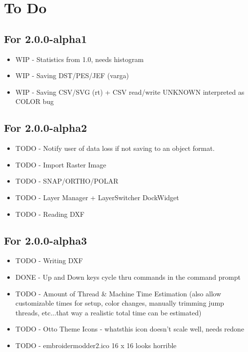 \documentclass{report}
\begin{document}
\section{To Do}

\subsection{For 2.0.0-alpha1}

\begin{itemize}
\item WIP - Statistics from 1.0, needs histogram
\item WIP - Saving DST/PES/JEF (varga)
\item WIP - Saving CSV/SVG (rt) + CSV read/write UNKNOWN interpreted as COLOR bug
\end{itemize}

\subsection{For 2.0.0-alpha2}

\begin{itemize}
\item TODO - Notify user of data loss if not saving to an object format.
\item TODO - Import Raster Image
\item TODO - SNAP/ORTHO/POLAR
\item TODO - Layer Manager + LayerSwitcher DockWidget
\item TODO - Reading DXF
\end{itemize}

\subsection{For 2.0.0-alpha3}

\begin{itemize}
\item TODO - Writing DXF
\item DONE - Up and Down keys cycle thru commands in the command prompt
\item TODO - Amount of Thread \& Machine Time Estimation (also allow customizable times for setup, color changes, manually trimming jump threads, etc...that way a realistic total time can be estimated)
\item TODO - Otto Theme Icons - whatsthis icon doesn't scale well, needs redone
\item TODO - embroidermodder2.ico 16 x 16 looks horrible
\end{itemize}
\end{document}
